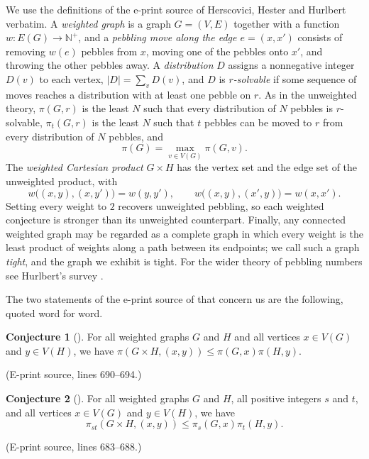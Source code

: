 \documentclass[11pt]{amsart}
\theoremstyle{definition}
\newtheorem{conjecture}{Conjecture}
\begin{document}
We use the definitions of the e-print source of Herscovici, Hester and
Hurlbert \cite{HHH} verbatim. A \emph{weighted graph} is a graph $G=(V,E)$ together
with a function $w:E(G)\to\mathbb N^{+}$, and a \emph{pebbling move along the
edge $e=(x,x')$} consists of removing $w(e)$ pebbles from $x$, moving one of
the pebbles onto $x'$, and throwing the other pebbles away.
A \emph{distribution} $D$
assigns a nonnegative integer $D(v)$ to each vertex, $|D|=\sum_vD(v)$, and
$D$ is \emph{$r$-solvable} if some sequence of moves reaches a distribution
with at least one pebble on $r$. As in the unweighted theory, $\pi(G,r)$ is
the least $N$ such that every distribution of $N$ pebbles is $r$-solvable,
$\pi_t(G,r)$ is the least $N$ such that $t$ pebbles can be moved to $r$ from
every distribution of $N$ pebbles, and
\begin{equation}\label{eq:unrooted}
  \pi(G)=\max_{v\in V(G)}\pi(G,v).
\end{equation}
The \emph{weighted Cartesian product} $G\times
H$ has the vertex set and the edge set of the unweighted product, with
\[
  w\bigl((x,y),(x,y')\bigr)=w(y,y'),\qquad
  w\bigl((x,y),(x',y)\bigr)=w(x,x').
\]
Setting every weight to $2$ recovers
unweighted pebbling, so each weighted conjecture is stronger than its
unweighted counterpart. Finally, any connected weighted graph may be regarded
as a complete graph in which every weight is the least product of weights
along a path between its endpoints; we call such a graph \emph{tight}, and the
graph we exhibit is tight. For the wider theory of pebbling numbers see
Hurlbert's survey \cite{Hurlbert}.

The two statements of the e-print source of \cite{HHH} that concern us are
the following, quoted word for word.

\begin{conjecture}[\cite{HHH}]\label{conj:W}
For all weighted graphs $G$ and $H$ and all vertices $x\in V(G)$ and $y\in
V(H)$, we have $\pi(G\times H,(x,y))\le\pi(G,x)\pi(H,y)$.
\end{conjecture}

\noindent
(E-print source, lines 690--694.)

\begin{conjecture}[\cite{HHH}]\label{conj:Wst}
For all weighted graphs $G$ and $H$, all positive integers $s$ and $t$, and
all vertices $x\in V(G)$ and $y\in V(H)$, we have
\[
  \pi_{st}(G\times H,(x,y))\le\pi_s(G,x)\pi_t(H,y).
\]
\end{conjecture}

\noindent
(E-print source, lines 683--688.)
\end{document}
